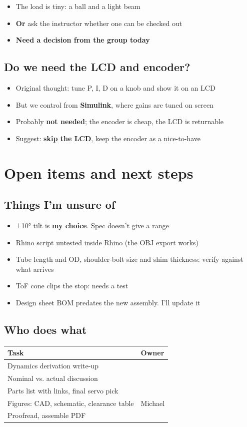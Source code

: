 \documentclass[11pt]{article}
\begin{document}
\begin{itemize}
\item The load is tiny: a ball and a light beam
\item \textbf{Or} ask the instructor whether one can be checked out
\item \textbf{Need a decision from the group today}
\end{itemize}
\subsection*{Do we need the LCD and encoder?}
\label{sec:org6e48dc7}
\begin{itemize}
\item Original thought: tune P, I, D on a knob and show it on an LCD
\item But we control from \textbf{Simulink}, where gains are tuned on screen
\item Probably \textbf{not needed}; the encoder is cheap, the LCD is returnable
\item Suggest: \textbf{skip the LCD}, keep the encoder as a nice-to-have
\end{itemize}
\section*{Open items and next steps}
\label{sec:orgcb7d794}
\subsection*{Things I'm unsure of}
\label{sec:org68ee94a}
\begin{itemize}
\item ±10° tilt is \textbf{my choice}. Spec doesn't give a range
\item Rhino script untested inside Rhino (the OBJ export works)
\item Tube length and OD, shoulder-bolt size and shim thickness: verify against what arrives
\item ToF cone clips the stop: needs a test
\item Design sheet BOM predates the new assembly. I'll update it
\end{itemize}
\subsection*{Who does what}
\label{sec:orgb54e7d0}
\begin{center}
\begin{tabular}{ll}
Task & Owner\\
\hline
Dynamics derivation write-up & \\
Nominal vs. actual discussion & \\
Parts list with links, final servo pick & \\
Figures: CAD, schematic, clearance table & Michael\\
Proofread, assemble PDF & \\
\end{tabular}
\end{center}
\end{document}
